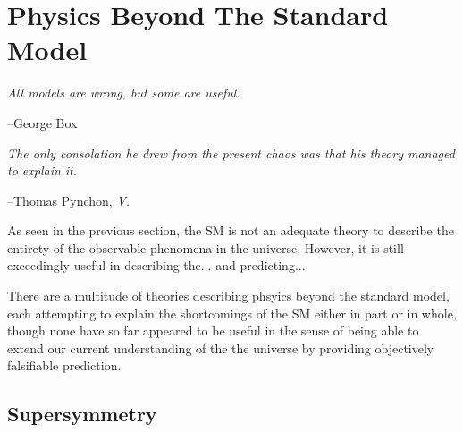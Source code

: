 \chapter{Physics Beyond The Standard Model}
\label{chap:bsm}

\epigraph{\textit{All models are wrong, but some are useful.}}{--George Box}
\epigraph{\textit{The only consolation he drew from the present chaos was that his theory managed to explain it.}}{--Thomas Pynchon, \textit{V.}}

As seen in the previous section, the SM is not an adequate theory to describe the entirety of the
observable phenomena in the universe. However, it is still exceedingly useful in describing
the... and predicting...

There are a multitude of theories describing phsyics beyond the standard model, each attempting to
explain the shortcomings of the SM either in part or in whole, though none have so far appeared to be
useful in the sense of being able to extend our current understanding of the the universe by providing
objectively falsifiable prediction.

\section{Supersymmetry}
